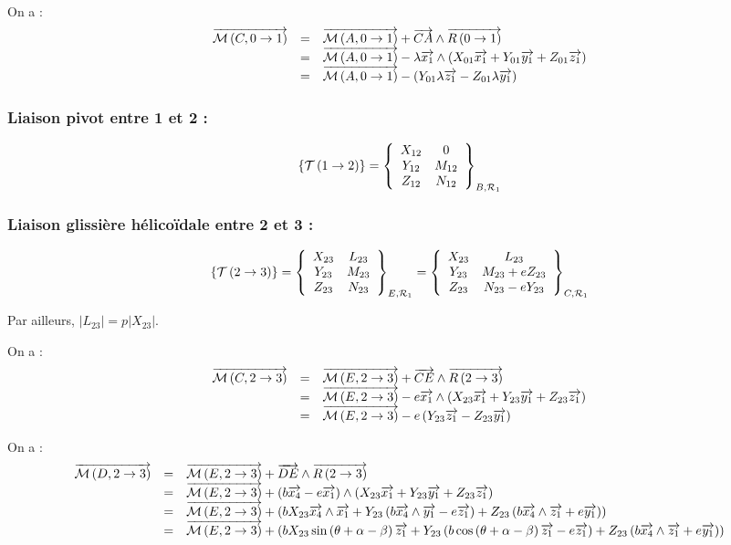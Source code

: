 \documentclass[10pt,fleqn]{article} %
\begin{document}
On a :
$$
\begin{array}{lcl}
\vectm{C}{0}{1} &=& \vectm{A}{0}{1} + \vect{CA} \wedge \vectf{0}{1} \\
&=& \vectm{A}{0}{1} -\lambda \vect{x_1} \wedge \left( X_{01} \vect{x_1} +Y_{01} \vect{y_1} +Z_{01} \vect{z_1}  \right) \\
&=& \vectm{A}{0}{1} - \left( Y_{01} \lambda \vect{z_1} - Z_{01} \lambda \vect{y_1} \right) \\
\end{array}
$$



\subsubsection*{Liaison pivot entre 1 et 2 :}
$$
\torseurstat{T}{1}{2}=\torseurcol{X_{12}}{Y_{12}}{Z_{12}}{0}{M_{12}}{N_{12}}{B,\mathcal{R}_1}
$$

\subsubsection*{Liaison glissière hélicoïdale entre 2 et 3 :}
$$
\torseurstat{T}{2}{3}
=\torseurcol{X_{23}}{Y_{23}}{Z_{23}}{L_{23}}{M_{23}}{N_{23}}{E,\mathcal{R}_1}
=\torseurcol{X_{23}}{Y_{23}}{Z_{23}}{L_{23}}{M_{23}+eZ_{23}}{N_{23}-eY_{23}}{C,\mathcal{R}_1}
$$

Par ailleurs, $|L_{23}|=p|X_{23}|$.

On a :
$$
\begin{array}{lcl}
\vectm{C}{2}{3} &=& \vectm{E}{2}{3} + \vect{CE} \wedge \vectf{2}{3} \\
&=& \vectm{E}{2}{3} - e\vect{x_1} \wedge \left( X_{23} \vect{x_1} +Y_{23} \vect{y_1} +Z_{23} \vect{z_1}  \right) \\
&=& \vectm{E}{2}{3} - e \left( Y_{23} \vect{z_1} -Z_{23} \vect{y_1}  \right) \\
\end{array}
$$


On a :
$$
\begin{array}{lcl}
\vectm{D}{2}{3} &=& \vectm{E}{2}{3} + \vect{DE} \wedge \vectf{2}{3} \\
&=& \vectm{E}{2}{3} + \left( b\vect{x_4}- e\vect{x_1} \right)\wedge \left( X_{23} \vect{x_1} +Y_{23} \vect{y_1} +Z_{23} \vect{z_1}  \right) \\
&=& \vectm{E}{2}{3} +  \left( b X_{23}\vect{x_4}  \wedge  \vect{x_1} +Y_{23}\left( b\vect{x_4}\wedge  \vect{y_1} - e\vect{z_1} \right) +Z_{23}\left( b\vect{x_4}\wedge  \vect{z_1}+e\vect{y_1}\right)  \right) \\
&=& \vectm{E}{2}{3} +  \left( b X_{23}\sin \left(\theta + \alpha -\beta\right) \vect{z_1} +Y_{23}\left( b\cos \left(\theta + \alpha -\beta\right)\vect{z_1}- e\vect{z_1} \right) +Z_{23}\left( b\vect{x_4}\wedge  \vect{z_1}+e\vect{y_1}\right)  \right) \\
\end{array}
$$
\end{document}
